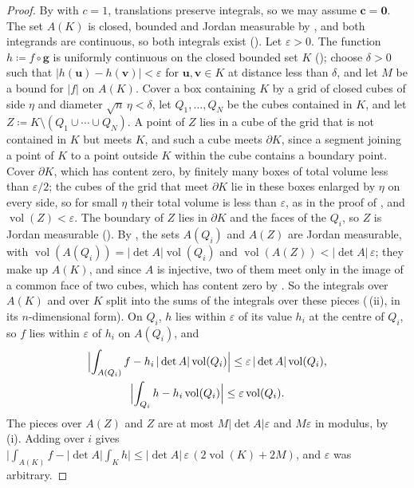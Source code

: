\begin{proof}
By  with $c=1$, translations preserve integrals, so we may assume $\mathbf c=\mathbf 0$. The set $A(K)$ is closed, bounded and Jordan measurable by , and both integrands are continuous, so both integrals exist (). Let $\varepsilon>0$. The function $h\coloneqq f\circ\mathbf g$ is uniformly continuous on the closed bounded set $K$ (); choose $\delta>0$ such that $|h(\mathbf u)-h(\mathbf v)|<\varepsilon$ for $\mathbf u,\mathbf v\in K$ at distance less than $\delta$, and let $M$ be a bound for $|f|$ on $A(K)$. Cover a box containing $K$ by a grid of closed cubes of side $\eta$ and diameter $\sqrt n\,\eta<\delta$, let $Q_1,\ldots,Q_N$ be the cubes contained in $K$, and let $Z\coloneqq K\setminus(Q_1\cup\cdots\cup Q_N)$. A point of $Z$ lies in a cube of the grid that is not contained in $K$ but meets $K$, and such a cube meets $\partial K$, since a segment joining a point of $K$ to a point outside $K$ within the cube contains a boundary point. Cover $\partial K$, which has content zero, by finitely many boxes of total volume less than $\varepsilon/2$; the cubes of the grid that meet $\partial K$ lie in these boxes enlarged by $\eta$ on every side, so for small $\eta$ their total volume is less than $\varepsilon$, as in the proof of , and $\operatorname{vol}(Z)<\varepsilon$. The boundary of $Z$ lies in $\partial K$ and the faces of the $Q_i$, so $Z$ is Jordan measurable (). By , the sets $A(Q_i)$ and $A(Z)$ are Jordan measurable, with $\operatorname{vol}(A(Q_i))=|\det A|\operatorname{vol}(Q_i)$ and $\operatorname{vol}(A(Z))<|\det A|\,\varepsilon$; they make up $A(K)$, and since $A$ is injective, two of them meet only in the image of a common face of two cubes, which has content zero by . So the integrals over $A(K)$ and over $K$ split into the sums of the integrals over these pieces (\,(ii), in its $n$-dimensional form). On $Q_i$, $h$ lies within $\varepsilon$ of its value $h_i$ at the centre of $Q_i$, so $f$ lies within $\varepsilon$ of $h_i$ on $A(Q_i)$, and
\begin{gather*}
\Bigl|\int_{A(Q_i)}f-h_i\,|\det A|\operatorname{vol}(Q_i)\Bigr|\le\varepsilon\,|\det A|\operatorname{vol}(Q_i),\\
\Bigl|\int_{Q_i}h-h_i\operatorname{vol}(Q_i)\Bigr|\le\varepsilon\operatorname{vol}(Q_i).
\end{gather*}
The pieces over $A(Z)$ and $Z$ are at most $M|\det A|\varepsilon$ and $M\varepsilon$ in modulus, by \,(i). Adding over $i$ gives $\bigl|\int_{A(K)}f-|\det A|\int_Kh\bigr|\le|\det A|\,\varepsilon\,(2\operatorname{vol}(K)+2M)$, and $\varepsilon$ was arbitrary.
\end{proof}

